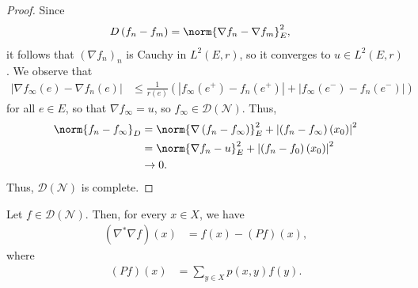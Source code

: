\documentclass[10pt]{mypackage}
\begin{document}
\begin{proof}
  Since
  \begin{align*}
    D\left( f_n-f_m \right) &= \norm{\nabla f_n - \nabla f_m}_{E}^2,
  \end{align*}
  it follows that $\left( \nabla f_n \right)_{n}$ is Cauchy in $L^2\left( E,r \right)$, so it converges to $u\in L^2\left( E,r \right)$. We observe that
  \begin{align*}
    \left\vert \nabla f_{\infty}(e) - \nabla f_n(e) \right\vert &\leq \frac{1}{r(e)} \left( \left\vert f_{\infty}\left( e^{+} \right) - f_{n}\left( e^{+} \right) \right\vert + \left\vert f_{\infty}\left( e^{-} \right) - f_n\left( e^{-} \right)\right\vert \right)
  \end{align*}
  for all $e\in E$, so that $\nabla f_{\infty} = u$, so $f_{\infty}\in \mathcal{D}\left( \mathcal{N} \right)$. Thus,
  \begin{align*}
    \norm{f_n-f_{\infty}}_{D} &= \norm{\nabla\left( f_n-f_{\infty} \right)}_E^2 + \left\vert \left( f_n-f_{\infty} \right)\left( x_0 \right) \right\vert^2\\
                              &= \norm{\nabla f_n - u}_E^2  + \left\vert \left( f_n-f_0 \right)\left( x_0 \right) \right\vert^2\\
                              &\to 0.
  \end{align*}
  Thus, $\mathcal{D}\left( \mathcal{N} \right)$ is complete.
\end{proof}
\begin{proposition}
  Let $f\in \mathcal{D}\left( \mathcal{N} \right)$. Then, for every $x\in X$, we have
  \begin{align*}
    \left( \nabla^{\ast}\nabla f \right)(x) &= f(x) - \left( Pf \right)(x),
  \end{align*}
  where
  \begin{align*}
    \left( Pf \right)(x) &= \sum_{y\in X} p\left( x,y \right)f(y).
  \end{align*}
\end{proposition}
\end{document}
